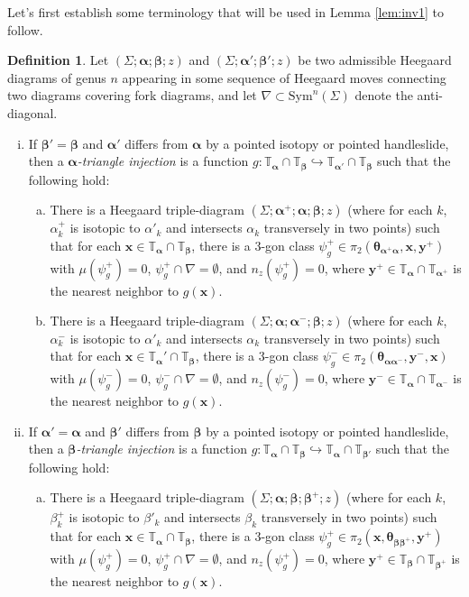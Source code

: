 \documentclass[11pt]{article}
\theoremstyle{plain} \newtheorem{thm}{Theorem}[subsection]
\theoremstyle{plain} \newtheorem{cor}[thm]{Corollary}
\theoremstyle{plain} \newtheorem{prop}[thm]{Proposition}
\theoremstyle{plain} \newtheorem{conj}[thm]{Conjecture}
\theoremstyle{plain} \newtheorem{lem}[thm]{Lemma}
\theoremstyle{definition} \newtheorem{df}[thm]{Definition}
\theoremstyle{remark} \newtheorem{rmk}[thm]{Remark}
\theoremstyle{remark} \newtheorem{obs}[thm]{Observation}
\newcommand{\ba}{\boldsymbol{\alpha}}
\newcommand{\bb}{\boldsymbol{\beta}}
\newcommand{\Ta}{\mathbb{T}_{\ba}}
\newcommand{\Tb}{\mathbb{T}_{\bb}}
\newcommand{\bx}{\mathbf{x}}
\newcommand{\by}{\mathbf{y}}
\newcommand{\thet}[1]{\boldsymbol{\theta}_{#1}}
\newcommand{\tor}[1]{\mathbb{T}_{#1}}
\newcommand{\AD}{\nabla}
\begin{document}
Let's first establish some terminology that will be used in Lemma \ref{lem:inv1} to follow.
\begin{df}\label{df:trimap}
Let $\left(\Sigma; \ba; \bb; z\right)$ and $\left(\Sigma; \ba'; \bb'; z\right)$ be two admissible Heegaard diagrams of genus $n$ appearing in some sequence of Heegaard moves connecting two diagrams covering fork diagrams, and let $\AD \subset \text{Sym}^n(\Sigma)$ denote the anti-diagonal.
\begin{enumerate}[(i)]
\item If $\bb' = \bb$ and $\ba'$ differs from $\ba$ by a pointed isotopy or pointed handleslide, then a $\ba$\textit{-triangle injection} is a function $g: \Ta \cap \Tb \hookrightarrow \tor{\ba'} \cap \Tb$ such that the following hold:
\begin{enumerate}[(a)]
\item There is a Heegaard triple-diagram $\left(\Sigma; \ba^{+}; \ba; \bb; z\right)$ (where for each $k$, $\alpha_{k}^{+}$ is isotopic to $\alpha'_{k}$ and intersects $\alpha_{k}$ transversely in two points) such that for each $\bx \in \Ta \cap \Tb$, there is a 3-gon class $\psi_{g}^{+} \in \pi_{2}(\thet{\ba^{+}\ba}, \bx, \by^{+})$ with $\mu(\psi_{g}^{+}) = 0$, $\psi_{g}^{+} \cap \AD = \emptyset$, and $n_{z}(\psi_{g}^{+}) = 0$, where $\by^{+} \in \Ta \cap \tor{\ba^{+}}$ is the nearest neighbor to $g(\bx)$.
\item There is a Heegaard triple-diagram $\left(\Sigma; \ba; \ba^{-}; \bb; z\right)$ (where for each $k$, $\alpha_{k}^{-}$ is isotopic to $\alpha'_{k}$ and intersects $\alpha_{k}$ transversely in two points)  such that for each $\bx \in \Ta' \cap \Tb$, there is a 3-gon class $\psi_{g}^{-} \in \pi_{2}(\thet{\ba\ba^{-}}, \by^{-}, \bx)$ with $\mu(\psi_{g}^{-}) = 0$, $\psi_{g}^{-} \cap \AD = \emptyset$, and $n_{z}(\psi_{g}^{-}) = 0$, where $\by^{-} \in \Ta \cap \tor{\ba^{-}}$ is the nearest neighbor to $g(\bx)$.
\end{enumerate}
\item If $\ba' = \ba$ and $\bb'$ differs from $\bb$ by a pointed isotopy or pointed handleslide, then a $\bb$\textit{-triangle injection} is a function $g: \Ta \cap \Tb \hookrightarrow \Ta \cap \tor{\bb'}$ such that the following hold:
\begin{enumerate}[(a)]
\item There is a Heegaard triple-diagram $\left(\Sigma; \ba; \bb; \bb^{+}; z\right)$ (where for each $k$, $\beta_{k}^{+}$ is isotopic to $\beta'_{k}$ and intersects $\beta_{k}$ transversely in two points) such that for each $\bx \in \Ta \cap \Tb$, there is a 3-gon class $\psi_{g}^{+} \in \pi_{2}(\bx, \thet{\bb\bb^{+}}, \by^{+})$ with $\mu(\psi_{g}^{+}) = 0$, $\psi_{g}^{+} \cap \AD = \emptyset$, and $n_{z}(\psi_{g}^{+}) = 0$, where $\by^{+} \in \Tb \cap \tor{\bb^{+}}$ is the nearest neighbor to $g(\bx)$.

\end{enumerate}
\end{enumerate}
\end{df}
\end{document}
